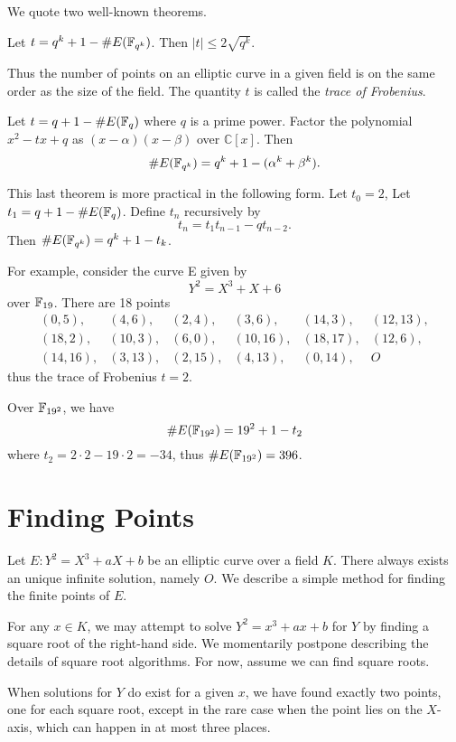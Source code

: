 We quote two well-known theorems.

\begin{theorem}
[Hasse] Let $t = q^k + 1 - \#E(\mathbb{F}_{q^k})$.
Then $|t| \le 2\sqrt{q^k}$.
\end{theorem}

Thus the number of points on an elliptic curve in a given field
is on the same order as the size of the field.
The quantity $t$ is called the \emph{trace of Frobenius}.

\begin{theorem}
[Weil] Let $t = q + 1 - \#E(\mathbb{F}_q)$
where $q$ is a prime power.
Factor the polynomial $x^2 - t x + q$ as $(x-\alpha)(x-\beta)$ over
$\mathbb{C}[x]$.
Then
\[ \#E(\mathbb{F}_{q^k}) = q^k + 1 - (\alpha^k + \beta^k) .\]
\end{theorem}

This last theorem is more practical in the following form. Let $t_0 = 2$,
Let $t_1 = q + 1 - \#E(\mathbb{F}_q)$.
Define $t_n$ recursively by
\[ t_n = t_1 t_{n-1} - q t_{n-2} .\]
Then $\#E(\mathbb{F}_{q^k}) = q^k + 1 - t_k$.

For example, consider the curve E\cite{bk} given by
\[ Y^2 = X^3 + X + 6 \]
over $\mathbb{F}_{19}$. There are 18 points
\[
\begin{array}{llllll}
(0,5), & (4,6), & (2,4), & (3,6), & (14,3), & (12,13), \\
(18,2), & (10,3), & (6,0), & (10,16), & (18, 17), & (12,6), \\
(14,16), & (3,13), & (2,15), & (4,13), & (0,14), & O
\end{array}
\]
thus the trace of Frobenius $t = 2$.

Over $\mathbb{F}_{{19}^2}$, we have
\[
\#E(\mathbb{F}_{{19}^2}) = 19^2 + 1 - t_2
\]
where $t_2 = 2\cdot 2 - 19 \cdot 2 = -34$, thus
$\#E(\mathbb{F}_{{19}^2}) = 396$.

\section {Finding Points}

Let $E : Y^2 = X^3 + a X + b$
be an elliptic curve over a field $K$.
There always exists an unique infinite solution, namely $O$.
We describe a simple method for finding the finite points of $E$.

For any $x \in K$, we may attempt to
solve $Y^2 = x^3 + a x + b$ for $Y$ by finding a square root
of the right-hand side. We momentarily postpone describing the
details of square root algorithms.
For now, assume we can find square roots.

When solutions for $Y$ do exist for a given $x$,
we have found exactly two points, one for each square root, except
in the rare case when the point lies on the $X$-axis, which can happen in
at most three places.

